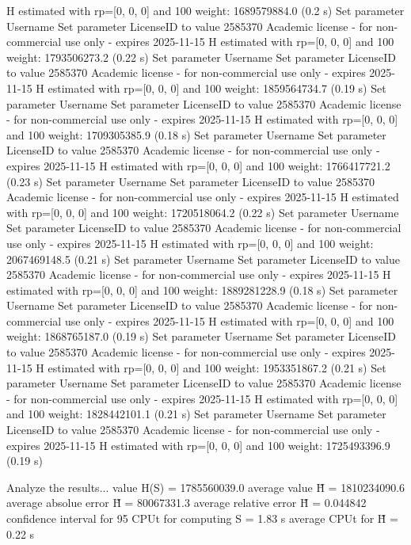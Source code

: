   H estimated with rp=[0, 0, 0] and 100 weight:  1689579884.0  (0.2 s)
Set parameter Username
Set parameter LicenseID to value 2585370
Academic license - for non-commercial use only - expires 2025-11-15
  H estimated with rp=[0, 0, 0] and 100 weight:  1793506273.2  (0.22 s)
Set parameter Username
Set parameter LicenseID to value 2585370
Academic license - for non-commercial use only - expires 2025-11-15
  H estimated with rp=[0, 0, 0] and 100 weight:  1859564734.7  (0.19 s)
Set parameter Username
Set parameter LicenseID to value 2585370
Academic license - for non-commercial use only - expires 2025-11-15
  H estimated with rp=[0, 0, 0] and 100 weight:  1709305385.9  (0.18 s)
Set parameter Username
Set parameter LicenseID to value 2585370
Academic license - for non-commercial use only - expires 2025-11-15
  H estimated with rp=[0, 0, 0] and 100 weight:  1766417721.2  (0.23 s)
Set parameter Username
Set parameter LicenseID to value 2585370
Academic license - for non-commercial use only - expires 2025-11-15
  H estimated with rp=[0, 0, 0] and 100 weight:  1720518064.2  (0.22 s)
Set parameter Username
Set parameter LicenseID to value 2585370
Academic license - for non-commercial use only - expires 2025-11-15
  H estimated with rp=[0, 0, 0] and 100 weight:  2067469148.5  (0.21 s)
Set parameter Username
Set parameter LicenseID to value 2585370
Academic license - for non-commercial use only - expires 2025-11-15
  H estimated with rp=[0, 0, 0] and 100 weight:  1889281228.9  (0.18 s)
Set parameter Username
Set parameter LicenseID to value 2585370
Academic license - for non-commercial use only - expires 2025-11-15
  H estimated with rp=[0, 0, 0] and 100 weight:  1868765187.0  (0.19 s)
Set parameter Username
Set parameter LicenseID to value 2585370
Academic license - for non-commercial use only - expires 2025-11-15
  H estimated with rp=[0, 0, 0] and 100 weight:  1953351867.2  (0.21 s)
Set parameter Username
Set parameter LicenseID to value 2585370
Academic license - for non-commercial use only - expires 2025-11-15
  H estimated with rp=[0, 0, 0] and 100 weight:  1828442101.1  (0.21 s)
Set parameter Username
Set parameter LicenseID to value 2585370
Academic license - for non-commercial use only - expires 2025-11-15
  H estimated with rp=[0, 0, 0] and 100 weight:  1725493396.9  (0.19 s)

Analyze the results...
  value H(S)                  = 1785560039.0 
  average value H̃             = 1810234090.6 
  average absolue error H̃     = 80067331.3 
  average relative error H̃    = 0.044842 
  confidence interval for 95%
  CPUt for computing S         = 1.83 s
  average CPUt for H̃           = 0.22 s

